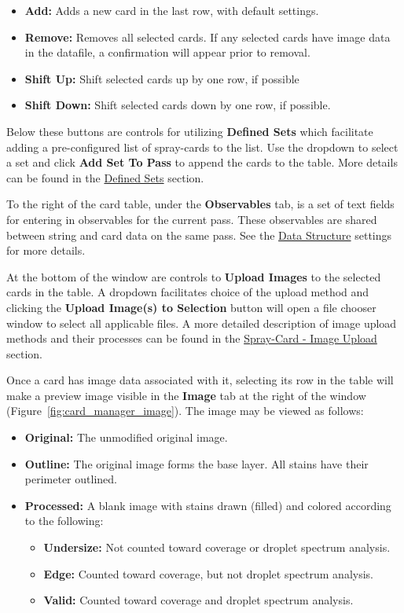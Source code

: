 \documentclass[10pt,letterpaper,titlepage]{article}
\begin{document}
    \begin{itemize}
        \item \textbf{Add:} Adds a new card in the last row, with default settings.
        \item \textbf{Remove:} Removes all selected cards. If any selected cards have image data in the datafile, a confirmation will appear prior to removal.
        \item \textbf{Shift Up:} Shift selected cards up by one row, if possible
        \item \textbf{Shift Down:} Shift selected cards down by one row, if possible.
    \end{itemize}
    Below these buttons are controls for utilizing \textbf{Defined Sets} which facilitate adding a pre-configured list of spray-cards to the list. Use the dropdown to select a set and click \textbf{Add Set To Pass} to append the cards to the table. More details can be found in the \hyperref[sec:defined_sets]{Defined Sets} section.\par
    To the right of the card table, under the \textbf{Observables} tab, is a set of text fields for entering in observables for the current pass. These observables are shared between string and card data on the same pass. See the \hyperref[sec:data]{Data Structure} settings for more details.\par
    At the bottom of the window are controls to \textbf{Upload Images} to the selected cards in the table. A dropdown facilitates choice of the upload method and clicking the \textbf{Upload Image(s) to Selection} button will open a file chooser window to select all applicable files. A more detailed description of image upload methods and their processes can be found in the \hyperref[sec:image_upload]{Spray-Card - Image Upload} section.\par
    Once a card has image data associated with it, selecting its row in the table will make a preview image visible in the \textbf{Image} tab at the right of the window (Figure~\ref{fig:card_manager_image}). The image may be viewed as follows:
    \begin{itemize}
        \item \textbf{Original:} The unmodified original image.
        \item \textbf{Outline:} The original image forms the base layer. All stains have their perimeter outlined.
        \item \textbf{Processed:} A blank image with stains drawn (filled) and colored according to the following:
        \begin{itemize}
            \item \textbf{Undersize:} Not counted toward coverage or droplet spectrum analysis.
            \item \textbf{Edge:} Counted toward coverage, but not droplet spectrum analysis.
            \item \textbf{Valid:} Counted toward coverage and droplet spectrum analysis.
        \end{itemize}
    \end{itemize}
\end{document}
